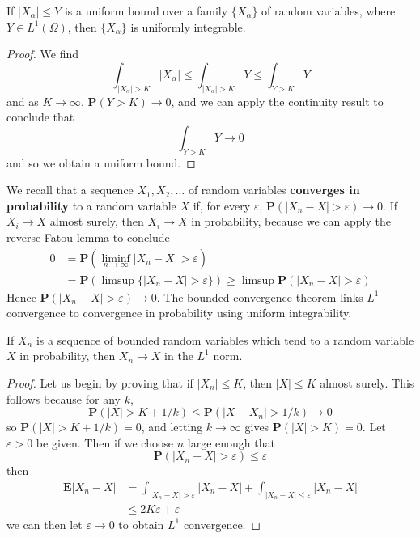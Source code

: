 \begin{corollary}
    If $|X_\alpha| \leq Y$ is a uniform bound over a family $\{ X_\alpha \}$ of random variables, where $Y \in L^1(\Omega)$, then $\{ X_\alpha \}$ is uniformly integrable.
\end{corollary}
\begin{proof}
    We find
    \[ \int_{|X_\alpha| > K} |X_\alpha| \leq \int_{|X_\alpha| > K} Y \leq \int_{Y > K} Y \]
    and as $K \to \infty$, $\mathbf{P}(Y > K) \to 0$, and we can apply the continuity result to conclude that
    \[ \int_{Y > K} Y \to 0 \]
    and so we obtain a uniform bound.
\end{proof}

We recall that a sequence $X_1, X_2, \dots$ of random variables {\bf converges in probability} to a random variable $X$ if, for every $\varepsilon$, $\mathbf{P}(|X_n - X| > \varepsilon) \to 0$. If $X_i \to X$ almost surely, then $X_i \to X$ in probability, because we can apply the reverse Fatou lemma to conclude
%
\begin{align*}
    0 &= \mathbf{P} \left( \liminf_{n \to \infty} |X_n - X| > \varepsilon \right)\\
    &= \mathbf{P} \left( \limsup \{ |X_n - X| > \varepsilon \} \right) \geq \limsup \mathbf{P}(|X_n - X| > \varepsilon)
\end{align*}
%
Hence $\mathbf{P}(|X_n - X| > \varepsilon) \to 0$. The bounded convergence theorem links $L^1$ convergence to convergence in probability using uniform integrability.

\begin{theorem}
    If $X_n$ is a sequence of bounded random variables which tend to a random variable $X$ in probability, then $X_n \to X$ in the $L^1$ norm.
\end{theorem}
\begin{proof}
    Let us begin by proving that if $|X_n| \leq K$, then $|X| \leq K$ almost surely. This follows because for any $k$,
    \[ \mathbf{P}(|X| > K + 1/k) \leq \mathbf{P}(|X - X_n| > 1/k) \to 0 \]
    so $\mathbf{P}(|X| > K + 1/k) = 0$, and letting $k \to \infty$ gives $\mathbf{P}(|X| > K) = 0$. Let $\varepsilon > 0$ be given. Then if we choose $n$ large enough that
    \[ \mathbf{P}(|X_n - X| > \varepsilon) \leq \varepsilon \]
    then
    \begin{align*}
        \mathbf{E}|X_n - X| &= \int_{|X_n - X| > \varepsilon} |X_n - X| + \int_{|X_n - X| \leq \varepsilon} |X_n - X|\\
        &\leq 2K\varepsilon + \varepsilon
    \end{align*}
    we can then let $\varepsilon \to 0$ to obtain $L^1$ convergence.
\end{proof}

